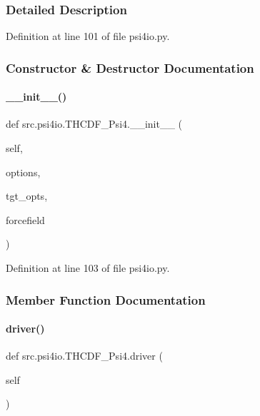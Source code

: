 \subsubsection{Detailed Description}


Definition at line 101 of file psi4io.\+py.



\subsubsection{Constructor \& Destructor Documentation}
\mbox{\label{classsrc_1_1psi4io_1_1THCDF__Psi4_a7d4a0b9b75eb7caa84888df5d1903f04}} 
\paragraph{\texorpdfstring{\+\_\+\+\_\+init\+\_\+\+\_\+()}{\_\_init\_\_()}}
{\footnotesize\ttfamily def src.\+psi4io.\+T\+H\+C\+D\+F\+\_\+\+Psi4.\+\_\+\+\_\+init\+\_\+\+\_\+ (\begin{DoxyParamCaption}\item[{}]{self,  }\item[{}]{options,  }\item[{}]{tgt\+\_\+opts,  }\item[{}]{forcefield }\end{DoxyParamCaption})}



Definition at line 103 of file psi4io.\+py.



\subsubsection{Member Function Documentation}
\mbox{\label{classsrc_1_1psi4io_1_1THCDF__Psi4_a88a67530b2c9d2a292fc4422930475a1}} 
\paragraph{\texorpdfstring{driver()}{driver()}}
{\footnotesize\ttfamily def src.\+psi4io.\+T\+H\+C\+D\+F\+\_\+\+Psi4.\+driver (\begin{DoxyParamCaption}\item[{}]{self }\end{DoxyParamCaption})}



